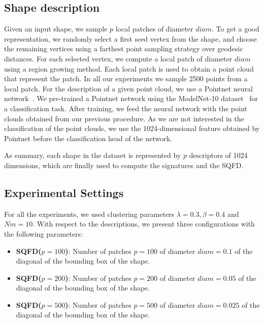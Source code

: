 \subsection*{Shape description}
Given an input shape, we sample $p$ local patches of diameter $diam$. To get a good representation, we randomly select a first seed vertex from the shape, and choose the remaining vertices using a farthest point sampling strategy over  geodesic distances. For each selected vertex, we compute a local patch of diameter $diam$ using a region growing method. 
Each local patch is used to obtain a point cloud that represent the patch. In all our experiments we sample 2500 points from a local patch. For the description of a given point cloud, we use a Pointnet neural network~\cite{Qi2017}. We pre-trained a Pointnet network using the ModelNet-10 dataset~\cite{Wu2015} for a classification task. After training, we feed the neural network with the point clouds obtained from our previous procedure. As we are not interested in the classification of the point clouds, we use the 1024-dimensional feature obtained by Pointnet before the classification head of the network. 

As summary, each shape in the dataset is represented by $p$ descriptors of 1024 dimensions, which are finally used to compute the signatures and the SQFD.

\subsection*{Experimental Settings}
For all the experiments, we used clustering parameters $\lambda=0.3, \beta=0.4$ and $Nm=10$. With respect to the descriptions, we present three configurations with the following parameters:

\begin{itemize}
    \item \textbf{SQFD($p=100$)}: Number of patches $p = 100$ of diameter $diam = 0.1$ of the diagonal of the bounding box of the shape.
    \item \textbf{SQFD($p=200$)}: Number of patches $p = 200$ of diameter $diam = 0.05$ of the diagonal of the bounding box of the shape.
    \item \textbf{SQFD($p=500$)}: Number of patches $p = 500$ of diameter $diam = 0.025$ of the diagonal of the bounding box of the shape.
\end{itemize}
